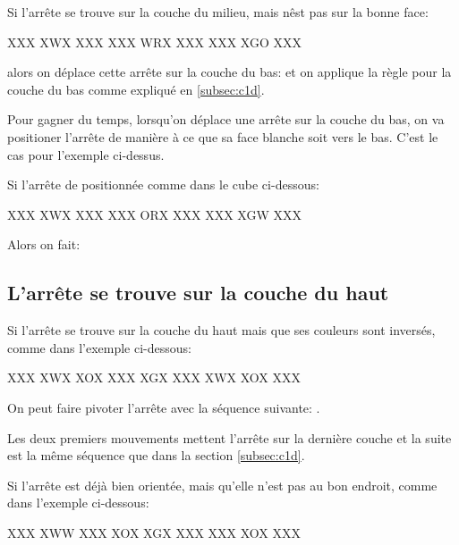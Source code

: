 Si l'arrête se trouve sur la couche du milieu, mais nêst pas sur la bonne face:

\begin{center}
	\RubikFaceUp%
	{X}{X}{X}%
	{X}{W}{X}%
	{X}{X}{X}
	\RubikFaceRight%
	{X}{X}{X}%
	{W}{R}{X}%
	{X}{X}{X}
	\RubikFaceFront%
	{X}{X}{X}%
	{X}{G}{O}%
	{X}{X}{X}
\end{center}

alors on déplace cette arrête sur la couche du bas:  et on applique la règle pour la couche du bas comme expliqué en \ref{subsec:c1d}.


Pour gagner du temps, lorsqu'on déplace une arrête sur la couche du bas, on va positioner l'arrête de manière à ce que sa face blanche soit vers le bas. C'est le cas pour l'exemple ci-dessus.

Si l'arrête de positionnée comme dans le cube ci-dessous:

\begin{center}
	\RubikFaceUp%
	{X}{X}{X}%
	{X}{W}{X}%
	{X}{X}{X}
	\RubikFaceRight%
	{X}{X}{X}%
	{O}{R}{X}%
	{X}{X}{X}
	\RubikFaceFront%
	{X}{X}{X}%
	{X}{G}{W}%
	{X}{X}{X}
\end{center}

Alors on fait: 

\subsection{L'arrête se trouve sur la couche du haut}

Si l'arrête se trouve sur la couche du haut mais que ses couleurs sont inversés, comme dans l'exemple ci-dessous:

\begin{center}
	\RubikFaceUp%
	{X}{X}{X}%
	{X}{W}{X}%
	{X}{O}{X}
	\RubikFaceRight%
	{X}{X}{X}%
	{X}{G}{X}%
	{X}{X}{X}
	\RubikFaceFront%
	{X}{W}{X}%
	{X}{O}{X}%
	{X}{X}{X}
\end{center}

On peut faire pivoter l'arrête avec la séquence suivante: .

Les deux premiers mouvements mettent l'arrête sur la dernière couche et la suite est la même séquence que dans la section \ref{subsec:c1d}.

\begin{samepage}
Si l'arrête est déjà bien orientée, mais qu'elle n'est pas au bon endroit, comme dans l'exemple ci-dessous:

\begin{center}
	\RubikFaceUp%
	{X}{X}{X}%
	{X}{W}{W}%
	{X}{X}{X}
	\RubikFaceRight%
	{X}{O}{X}%
	{X}{G}{X}%
	{X}{X}{X}
	\RubikFaceFront%
	{X}{X}{X}%
	{X}{O}{X}%
	{X}{X}{X}
\end{center}
\end{samepage}



